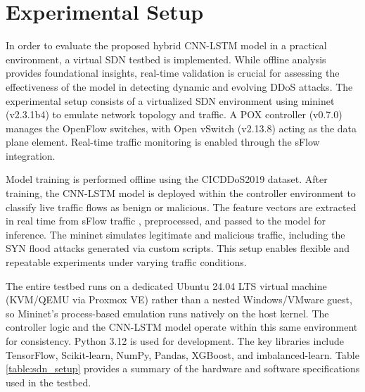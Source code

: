 \documentclass[ASNA,twocolumn]{USG} %
\begin{document}

\section{Experimental Setup}
\label{section:experimental_setup}

In order to evaluate the proposed hybrid CNN-LSTM model in a practical environment, a virtual SDN testbed is implemented. While offline analysis provides foundational insights, real-time validation is crucial for assessing the effectiveness of the model in detecting dynamic and evolving DDoS attacks. The experimental setup consists of a virtualized SDN environment using mininet (v2.3.1b4) \cite{dholakiya2021survey} to emulate network topology and traffic. A POX controller (v0.7.0) \cite{ccil2024comparative} manages the OpenFlow switches, with Open vSwitch (v2.13.8) \cite{basuki2022penerapan} acting as the data plane element. Real-time traffic monitoring is enabled through the sFlow integration.

Model training is performed offline using the CICDDoS2019 dataset. After training, the CNN-LSTM model is deployed within the controller environment to classify live traffic flows as benign or malicious. The feature vectors are extracted in real time from sFlow traffic \cite{sflowProtocol}, preprocessed, and passed to the model for inference. The mininet simulates legitimate and malicious traffic, including the SYN flood attacks generated via custom scripts. This setup enables flexible and repeatable experiments under varying traffic conditions.

The entire testbed runs on a dedicated Ubuntu 24.04 LTS virtual machine (KVM/QEMU via Proxmox VE) rather than a nested Windows/VMware guest, so Mininet's process-based emulation runs natively on the host kernel. The controller logic and the CNN-LSTM model operate within this same environment for consistency. Python 3.12 is used for development. The key libraries include TensorFlow, Scikit-learn, NumPy, Pandas, XGBoost, and imbalanced-learn. Table \ref{table:sdn_setup} provides a summary of the hardware and software specifications used in the testbed.
\end{document}
